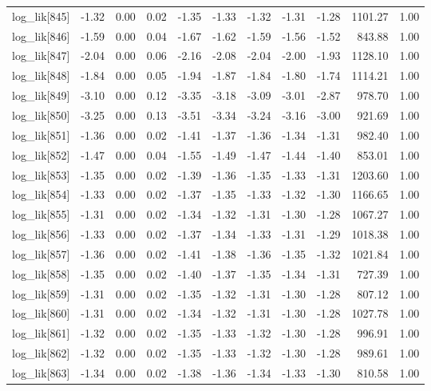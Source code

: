 \begin{table}[ht]
\begin{tabular}{rrrrrrrrrrr}
  log\_lik[845] & -1.32 & 0.00 & 0.02 & -1.35 & -1.33 & -1.32 & -1.31 & -1.28 & 1101.27 & 1.00 \\ 
  log\_lik[846] & -1.59 & 0.00 & 0.04 & -1.67 & -1.62 & -1.59 & -1.56 & -1.52 & 843.88 & 1.00 \\ 
  log\_lik[847] & -2.04 & 0.00 & 0.06 & -2.16 & -2.08 & -2.04 & -2.00 & -1.93 & 1128.10 & 1.00 \\ 
  log\_lik[848] & -1.84 & 0.00 & 0.05 & -1.94 & -1.87 & -1.84 & -1.80 & -1.74 & 1114.21 & 1.00 \\ 
  log\_lik[849] & -3.10 & 0.00 & 0.12 & -3.35 & -3.18 & -3.09 & -3.01 & -2.87 & 978.70 & 1.00 \\ 
  log\_lik[850] & -3.25 & 0.00 & 0.13 & -3.51 & -3.34 & -3.24 & -3.16 & -3.00 & 921.69 & 1.00 \\ 
  log\_lik[851] & -1.36 & 0.00 & 0.02 & -1.41 & -1.37 & -1.36 & -1.34 & -1.31 & 982.40 & 1.00 \\ 
  log\_lik[852] & -1.47 & 0.00 & 0.04 & -1.55 & -1.49 & -1.47 & -1.44 & -1.40 & 853.01 & 1.00 \\ 
  log\_lik[853] & -1.35 & 0.00 & 0.02 & -1.39 & -1.36 & -1.35 & -1.33 & -1.31 & 1203.60 & 1.00 \\ 
  log\_lik[854] & -1.33 & 0.00 & 0.02 & -1.37 & -1.35 & -1.33 & -1.32 & -1.30 & 1166.65 & 1.00 \\ 
  log\_lik[855] & -1.31 & 0.00 & 0.02 & -1.34 & -1.32 & -1.31 & -1.30 & -1.28 & 1067.27 & 1.00 \\ 
  log\_lik[856] & -1.33 & 0.00 & 0.02 & -1.37 & -1.34 & -1.33 & -1.31 & -1.29 & 1018.38 & 1.00 \\ 
  log\_lik[857] & -1.36 & 0.00 & 0.02 & -1.41 & -1.38 & -1.36 & -1.35 & -1.32 & 1021.84 & 1.00 \\ 
  log\_lik[858] & -1.35 & 0.00 & 0.02 & -1.40 & -1.37 & -1.35 & -1.34 & -1.31 & 727.39 & 1.00 \\ 
  log\_lik[859] & -1.31 & 0.00 & 0.02 & -1.35 & -1.32 & -1.31 & -1.30 & -1.28 & 807.12 & 1.00 \\ 
  log\_lik[860] & -1.31 & 0.00 & 0.02 & -1.34 & -1.32 & -1.31 & -1.30 & -1.28 & 1027.78 & 1.00 \\ 
  log\_lik[861] & -1.32 & 0.00 & 0.02 & -1.35 & -1.33 & -1.32 & -1.30 & -1.28 & 996.91 & 1.00 \\ 
  log\_lik[862] & -1.32 & 0.00 & 0.02 & -1.35 & -1.33 & -1.32 & -1.30 & -1.28 & 989.61 & 1.00 \\ 
  log\_lik[863] & -1.34 & 0.00 & 0.02 & -1.38 & -1.36 & -1.34 & -1.33 & -1.30 & 810.58 & 1.00 \\ 

\end{tabular}
\end{table}
